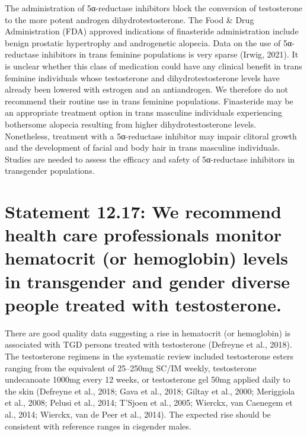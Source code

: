\documentclass[
]{book}
\begin{document}
The administration of 5α-reductase inhibitors
block the conversion of testosterone to the more
potent androgen dihydrotestosterone. The Food
\& Drug Administration (FDA) approved indications of finasteride administration include benign
prostatic hypertrophy and androgenetic alopecia.
Data on the use of 5α-reductase inhibitors in
trans feminine populations is very sparse (Irwig,
2021). It is unclear whether this class of medication could have any clinical benefit in trans
feminine individuals whose testosterone and dihydrotestosterone levels have already been lowered
with estrogen and an antiandrogen. We therefore
do not recommend their routine use in trans
feminine populations. Finasteride may be an
appropriate treatment option in trans masculine
individuals experiencing bothersome alopecia
resulting from higher dihydrotestosterone levels.
Nonetheless, treatment with a 5α-reductase inhibitor may impair clitoral growth and the development of facial and body hair in trans masculine
individuals. Studies are needed to assess the efficacy and safety of 5α-reductase inhibitors in
transgender populations.

\hypertarget{statement-12.17-we-recommend-health-care-professionals-monitor-hematocrit-or-hemoglobin-levels-in-transgender-and-gender-diverse-people-treated-with-testosterone.}{%
\section*{Statement 12.17: We recommend health care professionals monitor hematocrit (or hemoglobin) levels in transgender and gender diverse people treated with testosterone.}\label{statement-12.17-we-recommend-health-care-professionals-monitor-hematocrit-or-hemoglobin-levels-in-transgender-and-gender-diverse-people-treated-with-testosterone.}}

There are good quality data suggesting a rise
in hematocrit (or hemoglobin) is associated with
TGD persons treated with testosterone (Defreyne
et al., 2018). The testosterone regimens in the systematic review included testosterone esters ranging
from the equivalent of 25--250mg SC/IM weekly,
testosterone undecanoate 1000mg every 12 weeks,
or testosterone gel 50mg applied daily to the skin
(Defreyne et al., 2018; Gava et al., 2018; Giltay
et al., 2000; Meriggiola et al., 2008; Pelusi et al.,
2014; T'Sjoen et al., 2005; Wierckx, van Caenegem
et al., 2014; Wierckx, van de Peer et al., 2014).
The expected rise should be consistent with reference ranges in cisgender males.
\end{document}

